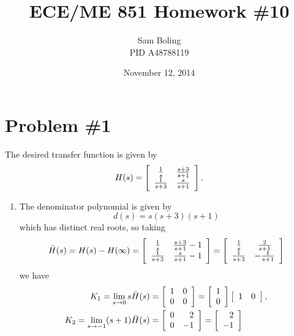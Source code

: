 \documentclass{article}
\title{ECE/ME 851 Homework \#10}
\date{November 12, 2014}
\author{Sam Boling \\ PID A48788119}
\begin{document}
\maketitle

\section*{Problem \#1}
The desired transfer function is given by
$$
H(s) =
\left[\begin{array}{c c}
  \frac{1}{s}   & \frac{s+3}{s+1} \\
  \frac{1}{s+3} & \frac{s}{s+1}
\end{array}\right].
$$
\begin{enumerate}
  \item{
    The denominator polynomial is given by
    $$
    d(s) = s(s+3)(s+1)
    $$
    which has distinct real roots, so taking
    $$
    \bar{H}(s) = H(s) - H(\infty) =
    \left[\begin{array}{c c}
      \frac{1}{s}   & \frac{s+3}{s+1} - 1 \\
      \frac{1}{s+3} & \frac{s}{s+1} - 1
    \end{array}\right] =
    \left[\begin{array}{c c}
      \frac{1}{s}   &  \frac{2}{s+1} \\
      \frac{1}{s+3} & -\frac{1}{s+1}
    \end{array}\right]
    $$
    we have
    \begin{align*}
      K_1 = \lim_{s \to 0} s \bar{H}(s) &=
      \left[\begin{array}{c c}
        1 & 0 \\
        0 & 0
      \end{array}\right] =
      \left[\begin{array}{c}
        1 \\
        0
      \end{array}\right]
      \left[\begin{array}{c c}
        1 & 0
      \end{array}\right], \\
      K_2 = \lim_{s \to -1} (s+1)\bar{H}(s) &=
      \left[\begin{array}{r r}
        0 &  2 \\
        0 & -1
      \end{array}\right] =
      \left[\begin{array}{r}
         2 \\
        -1
      \end{array}\right]

\end{align*}}
\end{enumerate}
\end{document}
